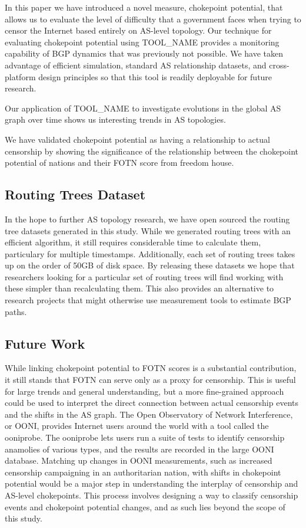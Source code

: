 \documentclass{article}
\newcommand{\toolname}{{\color{blue}TOOL\_NAME }}
\begin{document}
\begin{multicols}{2}
In this paper we have introduced a novel measure, chokepoint potential, that allows us to
evaluate the level of difficulty that a government faces when trying to censor the Internet
based entirely on AS-level topology. Our technique for evaluating chokepoint potential using
\toolname provides a monitoring capability of BGP dynamics that was previously not possible.
We have taken advantage of efficient simulation, standard AS relationship datasets, and cross-platform
design principles so that this tool is readily deployable for future research.
\par
Our application of \toolname to investigate evolutions in the global AS graph over time shows us
interesting trends in AS topologies.
\par
We have validated chokepoint potential as having a relationship to actual censorship by showing
the significance of the relationship between the chokepoint potential of nations and their FOTN
score from freedom house.

\subsection{Routing Trees Dataset}
In the hope to further AS topology research, we have open sourced the routing tree datasets generated in this study. While we generated routing trees
with an efficient algorithm, it still requires considerable time to calculate them, particulary for multiple timestamps. Additionally, each set of routing trees
takes up on the order of 50GB of disk space. By releasing these datasets we hope that researchers looking for a particular set of routing trees will find
working with these simpler than recalculating them. This also provides an alternative to research projects that might otherwise use measurement tools to estimate
BGP paths.



\subsection{Future Work}
While linking chokepoint potential to FOTN scores is a substantial contribution, it still stands that FOTN can serve only as a proxy for censorship.
This is useful for large trends and general understanding, but a more fine-grained approach could be used to interpret the direct connection between
actual censorship events and the shifts in the AS graph. The Open Observatory of Network Interference, or OONI, \cite{OONI} provides Internet users around
the world with a tool called the ooniprobe. The ooniprobe lets users run a suite of tests to identify censorship anamolies of various types, and the results are
recorded in the large OONI database. Matching up changes in OONI measurements, such as increased censorship campaigning in an authoritarian nation, with shifts
in chokepoint potential would be a major step in understanding the interplay of censorship and AS-level chokepoints. This process involves designing a way to classify
censorship events and chokepoint potential changes, and as such lies beyond the scope of this study.




\end{multicols}
\end{document}
